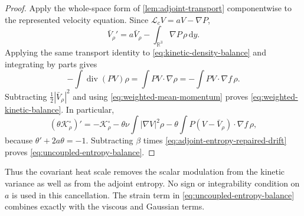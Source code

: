 \documentclass[11pt]{amsart}
\numberwithin{equation}{section}
\theoremstyle{plain}
\theoremstyle{definition}
\theoremstyle{remark}
\newcommand{\R}{\mathbb R}
\newcommand{\dd}{\,\mathrm d}
\newcommand{\diver}{\operatorname{div}}
\begin{document}
\begin{proof}
Apply the whole-space form of \cref{lem:adjoint-transport} componentwise to
the represented velocity equation.  Since
\(\mathcal L_cV=aV-\nabla P\),
\begin{equation}\label{eq:weighted-mean-momentum}
 \bar V_\rho'=a\bar V_\rho-
 \int_{\R^3}\nabla P\,\rho\dd y.
\end{equation}
Applying the same transport identity to
\eqref{eq:kinetic-density-balance} and integrating by parts gives
\[
 -\int\diver(PV)\rho
 =\int PV\cdot\nabla\rho
 =-\int PV\cdot\nabla f\,\rho.
\]
Subtracting \(\frac12|\bar V_\rho|^2\) and using
\eqref{eq:weighted-mean-momentum} proves
\eqref{eq:weighted-kinetic-balance}.  In particular,
\[
 (\theta\mathcal K_\rho^\circ)'
 =-\mathcal K_\rho^\circ
  -\theta\nu\int|\nabla V|^2\rho
  -\theta\int P(V-\bar V_\rho)\cdot\nabla f\,\rho,
\]
because \(\theta'+2a\theta=-1\).  Subtracting \(\beta\) times
\eqref{eq:adjoint-entropy-repaired-drift} proves
\eqref{eq:uncoupled-entropy-balance}.
\end{proof}

Thus the covariant heat scale removes the scalar modulation from the kinetic
variance as well as from the adjoint entropy.  No sign or integrability
condition on \(a\) is used in this cancellation.  The strain term in
\eqref{eq:uncoupled-entropy-balance} combines exactly with the viscous and
Gaussian terms.
\end{document}
